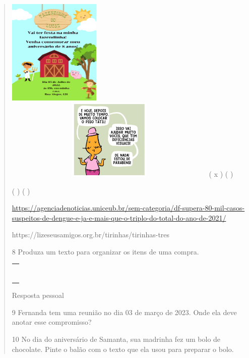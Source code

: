 {{{{\begin{verse}
{{\begin{escolha}
\includegraphics[width=1.73819in,height=1.98472in]{media/image109.png}\includegraphics[width=4.02222in,height=1.52917in]{media/image110.png}
( x ) ( )

( ) ( )

\url{https://agenciadenoticias.uniceub.br/sem-categoria/df-supera-80-mil-casos-suspeitos-de-dengue-e-ja-e-mais-que-o-triplo-do-total-do-ano-de-2021/}

https://lizeseusamigos.org.br/tirinhas/tirinhas-tres

\num{8} Produza um texto para organizar os itens de uma compra.


\begin{longtable}[]{@{}l@{}}
\toprule
\tabularnewline
\tabularnewline
\tabularnewline
\tabularnewline
\tabularnewline
\tabularnewline
\tabularnewline
\bottomrule
\end{longtable}

Resposta pessoal

\num{9} Fernanda tem uma reunião no dia 03 de março de 2023. Onde ela
deve anotar esse compromisso?


\num{10} No dia do aniversário de Samanta, sua madrinha fez um bolo de
chocolate. Pinte o balão com o texto que ela usou para preparar o bolo.



\end{escolha}}}
\end{verse}}}}}
